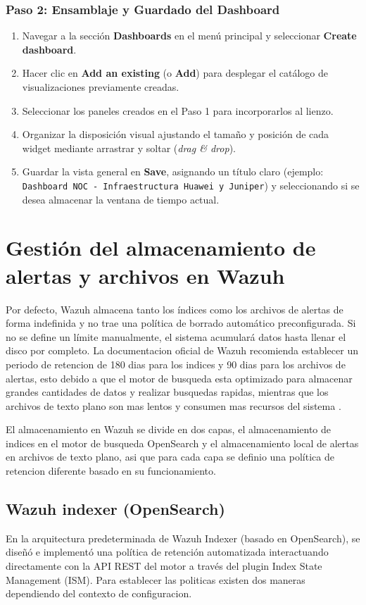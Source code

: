 \subsubsection{Paso 2: Ensamblaje y Guardado del Dashboard}
\begin{enumerate}
    \item Navegar a la sección \textbf{Dashboards} en el menú principal y seleccionar \textbf{Create dashboard}.
    \item Hacer clic en \textbf{Add an existing} (o \textbf{Add}) para desplegar el catálogo de visualizaciones previamente creadas.
    \item Seleccionar los paneles creados en el Paso 1 para incorporarlos al lienzo.
    \item Organizar la disposición visual ajustando el tamaño y posición de cada widget mediante arrastrar y soltar (\textit{drag \& drop}).
    \item Guardar la vista general en \textbf{Save}, asignando un título claro (ejemplo: \texttt{Dashboard NOC - Infraestructura Huawei y Juniper}) y seleccionando si se desea almacenar la ventana de tiempo actual.
\end{enumerate}

\section{Gestión del almacenamiento de alertas y archivos en Wazuh}
Por defecto, Wazuh almacena tanto los índices como los archivos de alertas de forma indefinida y no trae una política de borrado automático preconfigurada. Si no se define un límite manualmente, el sistema acumulará datos hasta llenar el disco por completo. La documentacion oficial de Wazuh recomienda establecer un periodo de retencion de 180 dias para los indices y 90 dias para los archivos de alertas, esto debido a que el motor de busqueda esta optimizado para almacenar grandes cantidades de datos y realizar busquedas rapidas, mientras que los archivos de texto plano son mas lentos y consumen mas recursos del sistema \cite{wazuh_index_lifecycle}.

El almacenamiento en Wazuh se divide en dos capas, el almacenamiento de indices en el motor de busqueda OpenSearch y el almacenamiento local de alertas en archivos de texto plano, asi que para cada capa se definio una política de retencion diferente basado en su funcionamiento.

\subsection{Wazuh indexer (OpenSearch)}
En la arquitectura predeterminada de Wazuh Indexer (basado en OpenSearch), se diseñó e implementó una política de retención automatizada interactuando directamente con la API REST del motor a través del plugin Index State Management (ISM). Para establecer las politicas existen dos maneras dependiendo del contexto de configuracion.

